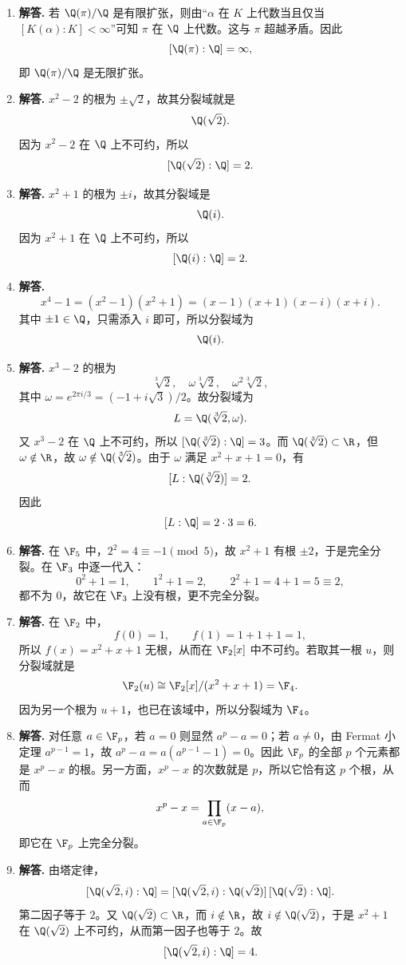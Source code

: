 \begin{enumerate}[label=\textbf{\arabic*.}, leftmargin=*, itemsep=1em]
\item \textbf{解答.} 若 $\Q(\pi)/\Q$ 是有限扩张，则由“$\alpha$ 在 $K$ 上代数当且仅当 $[K(\alpha):K]<\infty$”可知 $\pi$ 在 $\Q$ 上代数。这与 $\pi$ 超越矛盾。因此
\[
[\Q(\pi):\Q]=\infty,
\]
即 $\Q(\pi)/\Q$ 是无限扩张。

\item \textbf{解答.} $x^2-2$ 的根为 $\pm\sqrt2$，故其分裂域就是
\[
\Q(\sqrt2).
\]
因为 $x^2-2$ 在 $\Q$ 上不可约，所以
\[
[\Q(\sqrt2):\Q]=2.
\]

\item \textbf{解答.} $x^2+1$ 的根为 $\pm i$，故其分裂域是
\[
\Q(i).
\]
因为 $x^2+1$ 在 $\Q$ 上不可约，所以
\[
[\Q(i):\Q]=2.
\]

\item \textbf{解答.}
\[
x^4-1=(x^2-1)(x^2+1)=(x-1)(x+1)(x-i)(x+i).
\]
其中 $\pm1\in\Q$，只需添入 $i$ 即可，所以分裂域为
\[
\Q(i).
\]

\item \textbf{解答.} $x^3-2$ 的根为
\[
\sqrt[3]{2},\quad \omega\sqrt[3]{2},\quad \omega^2\sqrt[3]{2},
\]
其中 $\omega=e^{2\pi i/3}=(-1+i\sqrt3)/2$。故分裂域为
\[
L=\Q(\sqrt[3]{2},\omega).
\]
又 $x^3-2$ 在 $\Q$ 上不可约，所以 $[\Q(\sqrt[3]{2}):\Q]=3$。而 $\Q(\sqrt[3]{2})\subset\R$，但 $\omega\notin\R$，故 $\omega\notin\Q(\sqrt[3]{2})$。由于 $\omega$ 满足 $x^2+x+1=0$，有
\[
[L:\Q(\sqrt[3]{2})]=2.
\]
因此
\[
[L:\Q]=2\cdot3=6.
\]

\item \textbf{解答.} 在 $\F_5$ 中，$2^2=4\equiv -1\pmod 5$，故 $x^2+1$ 有根 $\pm2$，于是完全分裂。\;在 $\F_3$ 中逐一代入：
\[
0^2+1=1,\qquad 1^2+1=2,\qquad 2^2+1=4+1=5\equiv2,
\]
都不为 $0$，故它在 $\F_3$ 上没有根，更不完全分裂。

\item \textbf{解答.} 在 $\F_2$ 中，
\[
f(0)=1,\qquad f(1)=1+1+1=1,
\]
所以 $f(x)=x^2+x+1$ 无根，从而在 $\F_2[x]$ 中不可约。若取其一根 $u$，则分裂域就是
\[
\F_2(u)\cong \F_2[x]/(x^2+x+1)=\F_4.
\]
因为另一个根为 $u+1$，也已在该域中，所以分裂域为 $\F_4$。

\item \textbf{解答.} 对任意 $a\in\F_p$，若 $a=0$ 则显然 $a^p-a=0$；若 $a\neq0$，由 Fermat 小定理 $a^{p-1}=1$，故 $a^p-a=a(a^{p-1}-1)=0$。因此 $\F_p$ 的全部 $p$ 个元素都是 $x^p-x$ 的根。另一方面，$x^p-x$ 的次数就是 $p$，所以它恰有这 $p$ 个根，从而
\[
x^p-x=\prod_{a\in\F_p}(x-a),
\]
即它在 $\F_p$ 上完全分裂。

\item \textbf{解答.} 由塔定律，
\[
[\Q(\sqrt2,i):\Q]=[\Q(\sqrt2,i):\Q(\sqrt2)]\,[\Q(\sqrt2):\Q].
\]
第二因子等于 $2$。又 $\Q(\sqrt2)\subset\R$，而 $i\notin\R$，故 $i\notin\Q(\sqrt2)$，于是 $x^2+1$ 在 $\Q(\sqrt2)$ 上不可约，从而第一因子也等于 $2$。故
\[
[\Q(\sqrt2,i):\Q]=4.
\]


\end{enumerate}
